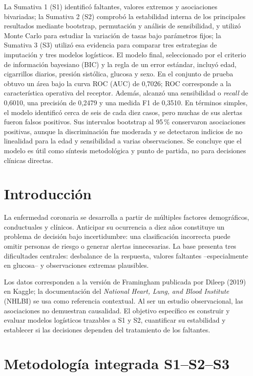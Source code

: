 \documentclass[10pt,a4paper]{article}
\begin{document}
La Sumativa 1 (S1) identificó faltantes, valores extremos y asociaciones bivariadas; la Sumativa 2 (S2) comprobó la estabilidad interna de los principales resultados mediante bootstrap, permutación y análisis de sensibilidad, y utilizó Monte Carlo para estudiar la variación de tasas bajo parámetros fijos; la Sumativa 3 (S3) utilizó esa evidencia para comparar tres estrategias de imputación y tres modelos logísticos. El modelo final, seleccionado por el criterio de información bayesiano (BIC) y la regla de un error estándar, incluyó edad, cigarrillos diarios, presión sistólica, glucosa y sexo. En el conjunto de prueba obtuvo un área bajo la curva ROC (AUC) de 0,7026; ROC corresponde a la característica operativa del receptor. Además, alcanzó una sensibilidad o \textit{recall} de 0,6010, una precisión de 0,2479 y una medida F1 de 0,3510. En términos simples, el modelo identificó cerca de seis de cada diez casos, pero muchas de sus alertas fueron falsos positivos. Sus intervalos bootstrap al 95\,\% conservaron asociaciones positivas, aunque la discriminación fue moderada y se detectaron indicios de no linealidad para la edad y sensibilidad a varias observaciones. Se concluye que el modelo es útil como síntesis metodológica y punto de partida, no para decisiones clínicas directas.

\section{Introducción}

La enfermedad coronaria se desarrolla a partir de múltiples factores demográficos, conductuales y clínicos. Anticipar su ocurrencia a diez años constituye un problema de decisión bajo incertidumbre: una clasificación incorrecta puede omitir personas de riesgo o generar alertas innecesarias. La base presenta tres dificultades centrales: desbalance de la respuesta, valores faltantes --especialmente en glucosa-- y observaciones extremas plausibles.

Los datos corresponden a la versión de Framingham publicada por Dileep (2019) en Kaggle; la documentación del \textit{National Heart, Lung, and Blood Institute} (NHLBI) se usa como referencia contextual. Al ser un estudio observacional, las asociaciones no demuestran causalidad. El objetivo específico es construir y evaluar modelos logísticos trazables a S1 y S2, cuantificar su estabilidad y establecer si las decisiones dependen del tratamiento de los faltantes.

\section{Metodología integrada S1--S2--S3}
\end{document}
